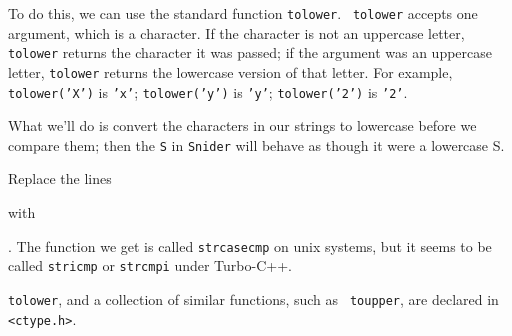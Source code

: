 To do this, we can use the standard function {\tt tolower}.  {\tt
tolower} accepts one argument, which is a character.  If the character
is not an uppercase letter, {\tt tolower} returns the character it was
passed; if the argument was an uppercase letter, {\tt tolower} returns
the lowercase version of that letter.  For example, {\tt tolower('X')}
is {\tt 'x'}; {\tt tolower('y')} is {\tt 'y'}; {\tt tolower('2')} is
{\tt '2'}.

What we'll do is convert the characters in our strings to lowercase
before we compare them; then the {\tt S} in {\tt Snider} will behave as
though it were a lowercase S.  

Replace the lines

\begin{flushleft}
\verb%    else if ( *s1 < *s2 )% \\*
\verb%      return -1;% \\*
\verb%    else if ( *s1 > *s2 )% \\*
\verb%      return 1;	% \\*
\end{flushleft}

with

\begin{flushleft}
\verb%    else if ( tolower(*s1) < tolower(*s2) )% \\*
\verb%      return -1;% \\*
\verb%    else if ( tolower(*s1) > tolower(*s2) )% \\*
\verb%      return 1;	% \\*
\end{flushleft}

\noindent.  The function we get is called {\tt strcasecmp} on {\sc unix}
systems, but it seems to be called {\tt stricmp} or {\tt strcmpi} under
Turbo-C++.  

{\tt tolower}, and a collection of similar functions, such as {\tt
toupper}, are declared in {\tt <ctype.h>}.


